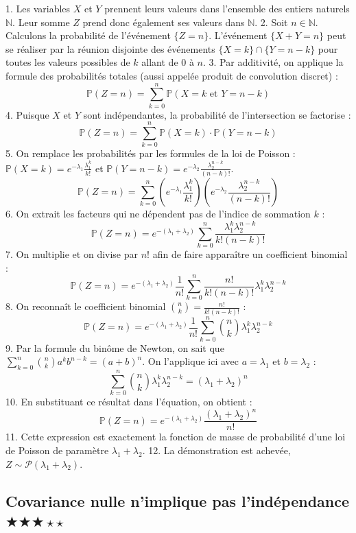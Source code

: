 \documentclass[11pt,a4paper]{article}
\begin{document}
1. Les variables $X$ et $Y$ prennent leurs valeurs dans l'ensemble des entiers naturels $\mathbb{N}$. Leur somme $Z$ prend donc également ses valeurs dans $\mathbb{N}$.
2. Soit $n \in \mathbb{N}$. Calculons la probabilité de l'événement $\{Z = n\}$.
   L'événement $\{X + Y = n\}$ peut se réaliser par la réunion disjointe des événements $\{X = k\} \cap \{Y = n - k\}$ pour toutes les valeurs possibles de $k$ allant de $0$ à $n$.
3. Par additivité, on applique la formule des probabilités totales (aussi appelée produit de convolution discret) :
   $$ \mathbb{P}(Z = n) = \sum_{k=0}^{n} \mathbb{P}(X = k \text{ et } Y = n - k) $$
4. Puisque $X$ et $Y$ sont indépendantes, la probabilité de l'intersection se factorise :
   $$ \mathbb{P}(Z = n) = \sum_{k=0}^{n} \mathbb{P}(X = k) \cdot \mathbb{P}(Y = n - k) $$
5. On remplace les probabilités par les formules de la loi de Poisson : $\mathbb{P}(X=k) = e^{-\lambda_1} \frac{\lambda_1^k}{k!}$ et $\mathbb{P}(Y=n-k) = e^{-\lambda_2} \frac{\lambda_2^{n-k}}{(n-k)!}$.
   $$ \mathbb{P}(Z = n) = \sum_{k=0}^{n} \left( e^{-\lambda_1} \frac{\lambda_1^k}{k!} \right) \left( e^{-\lambda_2} \frac{\lambda_2^{n-k}}{(n-k)!} \right) $$
6. On extrait les facteurs qui ne dépendent pas de l'indice de sommation $k$ :
   $$ \mathbb{P}(Z = n) = e^{-(\lambda_1 + \lambda_2)} \sum_{k=0}^{n} \frac{\lambda_1^k \lambda_2^{n-k}}{k!(n-k)!} $$
7. On multiplie et on divise par $n!$ afin de faire apparaître un coefficient binomial :
   $$ \mathbb{P}(Z = n) = e^{-(\lambda_1 + \lambda_2)} \frac{1}{n!} \sum_{k=0}^{n} \frac{n!}{k!(n-k)!} \lambda_1^k \lambda_2^{n-k} $$
8. On reconnaît le coefficient binomial $\binom{n}{k} = \frac{n!}{k!(n-k)!}$ :
   $$ \mathbb{P}(Z = n) = e^{-(\lambda_1 + \lambda_2)} \frac{1}{n!} \sum_{k=0}^{n} \binom{n}{k} \lambda_1^k \lambda_2^{n-k} $$
9. Par la formule du binôme de Newton, on sait que $\sum_{k=0}^{n} \binom{n}{k} a^k b^{n-k} = (a+b)^n$. On l'applique ici avec $a = \lambda_1$ et $b = \lambda_2$ :
   $$ \sum_{k=0}^{n} \binom{n}{k} \lambda_1^k \lambda_2^{n-k} = (\lambda_1 + \lambda_2)^n $$
10. En substituant ce résultat dans l'équation, on obtient :
    $$ \mathbb{P}(Z = n) = e^{-(\lambda_1 + \lambda_2)} \frac{(\lambda_1 + \lambda_2)^n}{n!} $$
11. Cette expression est exactement la fonction de masse de probabilité d'une loi de Poisson de paramètre $\lambda_1 + \lambda_2$.
12. La démonstration est achevée, $Z \sim \mathcal{P}(\lambda_1 + \lambda_2)$.


\subsection*{ Covariance nulle n'implique pas l'indépendance \quad $\bigstar\bigstar\bigstar\star\star$}
\end{document}
